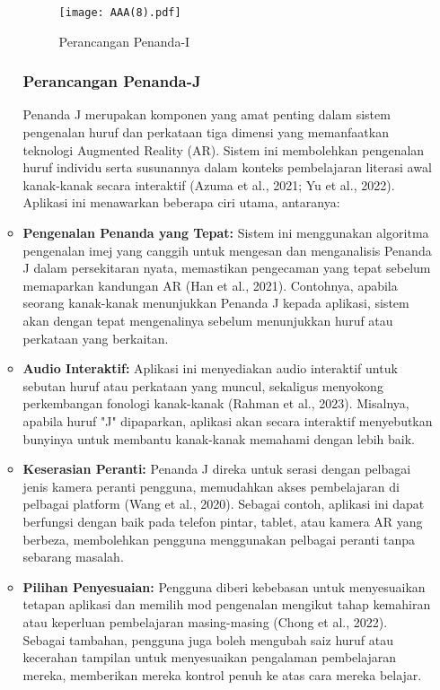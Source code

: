 \begin{itemize}
\begin{itemize}
\begin{figure}
    \centering
    \texttt{[image: AAA(8).pdf]}
    \caption{Perancangan Penanda-I}
    \label{I}
\end{figure}
\clearpage


 \subsubsection{Perancangan Penanda-J}
Penanda J merupakan komponen yang amat penting dalam sistem pengenalan huruf dan perkataan tiga dimensi yang memanfaatkan teknologi Augmented Reality (AR). Sistem ini membolehkan pengenalan huruf individu serta susunannya dalam konteks pembelajaran literasi awal kanak-kanak secara interaktif (Azuma et al., 2021; Yu et al., 2022). Aplikasi ini menawarkan beberapa ciri utama, antaranya:\\
 
\item \textbf{Pengenalan Penanda yang Tepat:} Sistem ini menggunakan algoritma pengenalan imej yang canggih untuk mengesan dan menganalisis Penanda J dalam persekitaran nyata, memastikan pengecaman yang tepat sebelum memaparkan kandungan AR (Han et al., 2021). Contohnya, apabila seorang kanak-kanak menunjukkan Penanda J kepada aplikasi, sistem akan dengan tepat mengenalinya sebelum menunjukkan huruf atau perkataan yang berkaitan.  \\
\item \textbf{Audio Interaktif:} Aplikasi ini menyediakan audio interaktif untuk sebutan huruf atau perkataan yang muncul, sekaligus menyokong perkembangan fonologi kanak-kanak (Rahman et al., 2023). Misalnya, apabila huruf "J" dipaparkan, aplikasi akan secara interaktif menyebutkan bunyinya untuk membantu kanak-kanak memahami dengan lebih baik. \\ 
\item \textbf{Keserasian Peranti:} Penanda J direka untuk serasi dengan pelbagai jenis kamera peranti pengguna, memudahkan akses pembelajaran di pelbagai platform (Wang et al., 2020). Sebagai contoh, aplikasi ini dapat berfungsi dengan baik pada telefon pintar, tablet, atau kamera AR yang berbeza, membolehkan pengguna menggunakan pelbagai peranti tanpa sebarang masalah.  \\
\item \textbf{Pilihan Penyesuaian:} Pengguna diberi kebebasan untuk menyesuaikan tetapan aplikasi dan memilih mod pengenalan mengikut tahap kemahiran atau keperluan pembelajaran masing-masing (Chong et al., 2022). Sebagai tambahan, pengguna juga boleh mengubah saiz huruf atau kecerahan tampilan untuk menyesuaikan pengalaman pembelajaran mereka, memberikan mereka kontrol penuh ke atas cara mereka belajar.  \\



\end{itemize}
\end{itemize}
